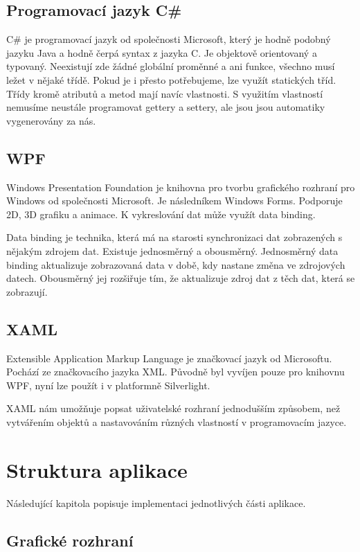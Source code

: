 \documentclass[
  field=inf,
  biblatex=false,
  glossaries,
  index
]{kidiplom}
\begin{document}
\subsection{Programovací jazyk C\#}
C\# je programovací jazyk od společnosti Microsoft, který je hodně podobný jazyku Java a hodně čerpá syntax z jazyka C. Je objektově orientovaný a typovaný. Neexistují zde žádné globální proměnné a ani funkce, všechno musí ležet v nějaké třídě. Pokud je i přesto potřebujeme, lze využít statických tříd. Třídy kromě atributů a metod mají navíc vlastnosti. S využitím vlastností nemusíme neustále programovat gettery a settery, ale jsou jsou automatiky vygenerovány za nás. \cite{cs}

\subsection{WPF}
Windows Presentation Foundation je knihovna pro tvorbu grafického rozhraní pro Windows od společnosti Microsoft. Je následníkem Windows Forms. Podporuje 2D, 3D grafiku a animace. K vykreslování dat může využít data binding. \cite{wpf}

Data binding je technika, která má na starosti synchronizaci dat zobrazených s nějakým zdrojem dat. Existuje jednosměrný a obousměrný. Jednosměrný data binding aktualizuje zobrazovaná data v době, kdy nastane změna ve zdrojových datech. Obousměrný jej rozšiřuje tím, že aktualizuje zdroj dat z těch dat, která se zobrazují.

\subsection{XAML}
Extensible Application Markup Language je značkovací jazyk od Microsoftu. Pochází ze značkovacího jazyka XML. Původně byl vyvíjen pouze pro knihovnu WPF, nyní lze použít i v platformně Silverlight.

XAML nám umožňuje popsat uživatelské rozhraní jednodušším způsobem, než vytvářením objektů a nastavováním různých vlastností v programovacím jazyce. \cite{xaml}




\section{Struktura aplikace}

Následující kapitola popisuje implementaci jednotlivých části aplikace.

\subsection{Grafické rozhraní}
\end{document}
